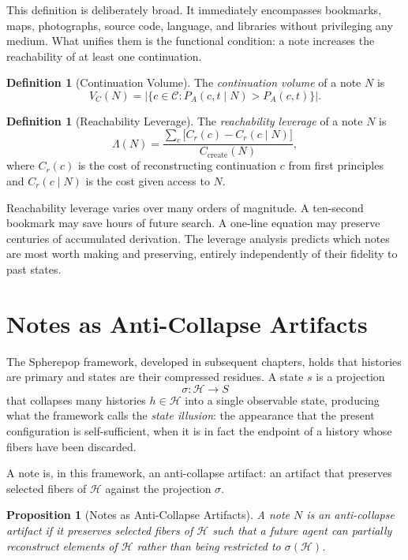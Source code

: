 \documentclass[12pt, a4paper, openany]{book}
\theoremstyle{plain}
\newtheorem{proposition}[theorem]{Proposition}
\theoremstyle{definition}
\newtheorem{definition}[theorem]{Definition}
\theoremstyle{remark}
\newcommand{\calH}{\mathcal{H}}
\newcommand{\calC}{\mathcal{C}}
\begin{document}
This definition is deliberately broad. It immediately encompasses bookmarks, maps,
photographs, source code, language, and libraries without privileging any medium.
What unifies them is the functional condition: a note increases the reachability
of at least one continuation.

\begin{definition}[Continuation Volume]
The \emph{continuation volume} of a note $N$ is
\[
V_C(N) = \bigl|\{c \in \calC : P_A(c, t \mid N) > P_A(c, t)\}\bigr|.
\]
\end{definition}

\begin{definition}[Reachability Leverage]
The \emph{reachability leverage} of a note $N$ is
\[
\Lambda(N) = \frac{\sum_{c} \bigl[C_r(c) - C_r(c \mid N)\bigr]}{C_{\text{create}}(N)},
\]
where $C_r(c)$ is the cost of reconstructing continuation $c$ from first principles
and $C_r(c \mid N)$ is the cost given access to $N$.
\end{definition}

Reachability leverage varies over many orders of magnitude. A ten-second bookmark
may save hours of future search. A one-line equation may preserve centuries of
accumulated derivation. The leverage analysis predicts which notes are most worth
making and preserving, entirely independently of their fidelity to past states.

\section{Notes as Anti-Collapse Artifacts}

The Spherepop framework, developed in subsequent chapters, holds that histories
are primary and states are their compressed residues. A state $s$ is a projection
\[
\sigma : \calH \to S
\]
that collapses many histories $h \in \calH$ into a single observable state,
producing what the framework calls the \emph{state illusion}: the appearance that
the present configuration is self-sufficient, when it is in fact the endpoint of
a history whose fibers have been discarded.

A note is, in this framework, an anti-collapse artifact: an artifact that preserves
selected fibers of $\calH$ against the projection $\sigma$.

\begin{proposition}[Notes as Anti-Collapse Artifacts]
A note $N$ is an anti-collapse artifact if it preserves selected fibers of $\calH$
such that a future agent can partially reconstruct elements of $\calH$ rather than
being restricted to $\sigma(\calH)$.
\end{proposition}
\end{document}
